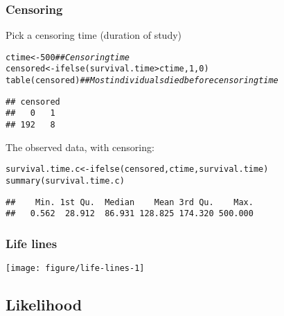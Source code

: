 \documentclass[color=usenames,dvipsnames]{beamer}\usepackage[]{graphicx}\usepackage[]{color}
\makeatletter
\newcommand{\hlnum}[1]{\textcolor[rgb]{0.69,0.494,0}{#1}}%
\newcommand{\hlcom}[1]{\textcolor[rgb]{0.514,0.506,0.514}{\textit{#1}}}%
\newcommand{\hlopt}[1]{\textcolor[rgb]{0,0,0}{#1}}%
\newcommand{\hlstd}[1]{\textcolor[rgb]{0,0,0}{#1}}%
\newcommand{\hlkwb}[1]{\textcolor[rgb]{0,0.341,0.682}{#1}}%
\newcommand{\hlkwd}[1]{\textcolor[rgb]{0.004,0.004,0.506}{#1}}%
\newenvironment{kframe}{%
 \def\at@end@of@kframe{}%
 \ifinner\ifhmode%
  \def\at@end@of@kframe{\end{minipage}}%
  \begin{minipage}{\columnwidth}%
 \fi\fi%
 \def\FrameCommand##1{\hskip\@totalleftmargin \hskip-\fboxsep
 \colorbox{shadecolor}{##1}\hskip-\fboxsep
     \hskip-\linewidth \hskip-\@totalleftmargin \hskip\columnwidth}%
 \MakeFramed {\advance\hsize-\width
   \@totalleftmargin\z@ \linewidth\hsize
   \@setminipage}}%
 {\par\unskip\endMakeFramed%
 \at@end@of@kframe}
\newenvironment{knitrout}{}{} %
\makeatother
\begin{document}
\begin{frame}[fragile]
  \frametitle{Censoring}
  Pick a censoring time (duration of study)
\begin{knitrout}\footnotesize
{}\color{fgcolor}\begin{kframe}
\begin{alltt}
\hlstd{ctime} \hlkwb{<-} \hlnum{500}    \hlcom{## Censoring time}
\hlstd{censored} \hlkwb{<-} \hlkwd{ifelse}\hlstd{(survival.time}\hlopt{>}\hlstd{ctime,} \hlnum{1}\hlstd{,} \hlnum{0}\hlstd{)}
\hlkwd{table}\hlstd{(censored)} \hlcom{## Most individuals died before censoring time}
\end{alltt}
\begin{verbatim}
## censored
##   0   1 
## 192   8
\end{verbatim}
\end{kframe}
\end{knitrout}
\pause
\vfill
The observed data, with censoring:
\begin{knitrout}\footnotesize
{}\color{fgcolor}\begin{kframe}
\begin{alltt}
\hlstd{survival.time.c} \hlkwb{<-} \hlkwd{ifelse}\hlstd{(censored, ctime, survival.time)}
\hlkwd{summary}\hlstd{(survival.time.c)}
\end{alltt}
\begin{verbatim}
##    Min. 1st Qu.  Median    Mean 3rd Qu.    Max. 
##   0.562  28.912  86.931 128.825 174.320 500.000
\end{verbatim}
\end{kframe}
\end{knitrout}
\end{frame}




\begin{frame}[fragile]
  \frametitle{Life lines}
\begin{knitrout}\footnotesize
{}\color{fgcolor}

{\centering \texttt{[image: figure/life-lines-1]} 

}


\end{knitrout}
\end{frame}




\subsection{Likelihood}
\end{document}

